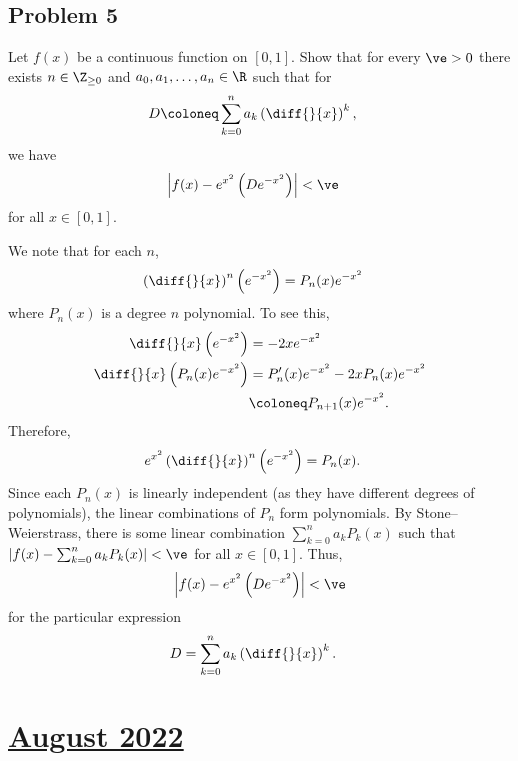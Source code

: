 \documentclass[10pt]{mypackage}
\begin{document}
\subsection{Problem 5}%
\begin{problem}
  Let $f(x)$ be a continuous function on $[0,1]$. Show that for every $\ve > 0$ there exists $n\in \Z_{\geq 0}$ and $a_0,a_1,\dots,a_n\in \R$ such that for
  \begin{align*}
    D &\coloneq \sum_{k=0}^{n} a_k\left( \diff{}{x} \right)^{k},
  \end{align*}
  we have
  \begin{align*}
    \left\vert f(x)-e^{x^2}\left( De^{-x^2} \right) \right\vert &< \ve
  \end{align*}
  for all $x\in [0,1]$.
\end{problem}
We note that for each $n$,
\begin{align*}
  \left( \diff{}{x} \right)^{n}\left( e^{-x^2} \right) &= P_n(x)e^{-x^2}
\end{align*}
where $P_n(x)$ is a degree $n$ polynomial. To see this,
\begin{align*}
  \diff{}{x}\left( e^{-x^2} \right) &= -2xe^{-x^2}\\
  \diff{}{x}\left( P_n(x)e^{-x^2} \right) &= P_n'(x)e^{-x^2} - 2xP_n(x)e^{-x^2}\\
                                          &\coloneq P_{n+1}(x)e^{-x^2}.
\end{align*}
Therefore,
\begin{align*}
  e^{x^2}\left( \diff{}{x} \right)^{n}\left( e^{-x^2} \right) &= P_n(x).
\end{align*}
Since each $P_n(x)$ is linearly independent (as they have different degrees of polynomials), the linear combinations of $P_n$ form polynomials. By Stone--Weierstrass, there is some linear combination $\sum_{k=0}^{n}a_kP_{k}(x)$ such that $\left\vert f(x)-\sum_{k=0}^{n}a_kP_k(x) \right\vert < \ve$ for all $x\in [0,1]$. Thus, 
\begin{align*}
  \left\vert f(x)-e^{x^2}\left( De^{-x^2} \right) \right\vert < \ve
\end{align*}
for the particular expression
\begin{align*}
  D &= \sum_{k=0}^{n}a_k\left( \diff{}{x} \right)^{k}.
\end{align*}

\section{\href{https://math.virginia.edu/graduate/exams/analysis/2022Aug_real.pdf}{August 2022}}%
\end{document}
